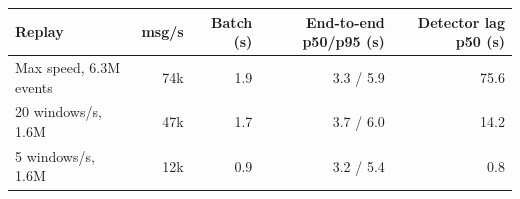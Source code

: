 \begin{tabular}{lrrrr}
\toprule
Replay & msg/s & Batch (s) & End-to-end p50/p95 (s) & Detector lag p50 (s) \\
\midrule
Max speed, 6.3M events & 74k & 1.9 & 3.3 / 5.9 & 75.6 \\
20 windows/s, 1.6M & 47k & 1.7 & 3.7 / 6.0 & 14.2 \\
5 windows/s, 1.6M & 12k & 0.9 & 3.2 / 5.4 & 0.8 \\
\bottomrule
\end{tabular}
